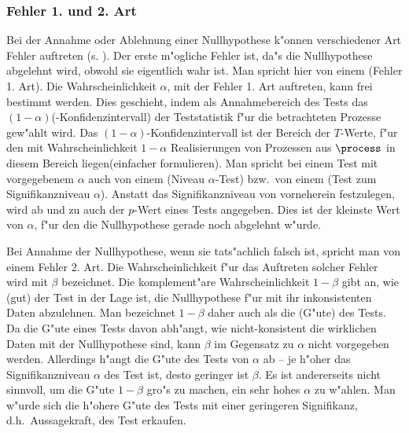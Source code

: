 \subsubsection{Fehler 1. und 2. Art}
Bei der Annahme oder Ablehnung einer Nullhypothese k"onnen verschiedener Art Fehler
auftreten (s. ). Der
erste m"ogliche Fehler ist, da"s die Nullhypothese abgelehnt wird, obwohl sie eigentlich wahr ist.
Man spricht hier von einem \begriff(Fehler 1. Art). Die Wahrscheinlichkeit $\alpha$, mit
der Fehler 1. Art auftreten, kann frei bestimmt werden. Dies geschieht, indem als
Annahmebereich des Tests das $(1-\alpha)$\begriff(-Konfidenzintervall) der Teststatistik
f"ur die betrachteten Prozesse gew"ahlt wird. Das $(1-\alpha)$-Konfidenzintervall ist der
Bereich der $T$-Werte, f"ur den mit Wahrscheinlichkeit $1-\alpha$ Realisierungen von
Prozessen aus $\process$ in diesem Bereich liegen\korrektur(einfacher formulieren).  Man
spricht bei einem Test mit vorgegebenem $\alpha$ auch von einem \begriff(Niveau
$\alpha$-Test) bzw.\ von einem \begriff(Test zum Signifikanzniveau $\alpha$). Anstatt das
Signifikanzniveau von vorneherein festzulegen, wird ab und zu auch der $p$-Wert eines Tests
angegeben. Dies ist der kleinste Wert von $\alpha$, f"ur den die Nullhypothese gerade noch
abgelehnt w"urde.

Bei Annahme der Nullhypothese, wenn sie tats"achlich falsch ist, spricht man von einem
Fehler 2. Art.  Die Wahrscheinlichkeit f"ur das Auftreten solcher Fehler wird mit $\beta$
bezeichnet. Die komplement"are Wahrscheinlichkeit $1-\beta$ gibt an, wie \naja(gut) der
Test in der Lage ist, die Nullhypothese f"ur mit ihr inkonsistenten Daten abzulehnen. Man
bezeichnet $1-\beta$ daher auch als die \begriff(G"ute) des Tests.  Da die G"ute eines
Tests davon abh"angt, wie nicht-konsistent die wirklichen Daten mit der Nullhypothese
sind, kann $\beta$ im Gegensatz zu $\alpha$ nicht vorgegeben werden.  Allerdings h"angt
die G"ute des Tests von $\alpha$ ab -- je h"oher das Signifikanzniveau $\alpha$ des Test
ist, desto geringer ist $\beta$. Es ist andererseits nicht sinnvoll, um die G"ute
$1-\beta$ gro"s zu machen, ein sehr hohes $\alpha$ zu w"ahlen. Man w"urde sich die h"ohere
G"ute des Tests mit einer geringeren Signifikanz\footnotemark, d.h.\ Aussagekraft, des
Test erkaufen.  

